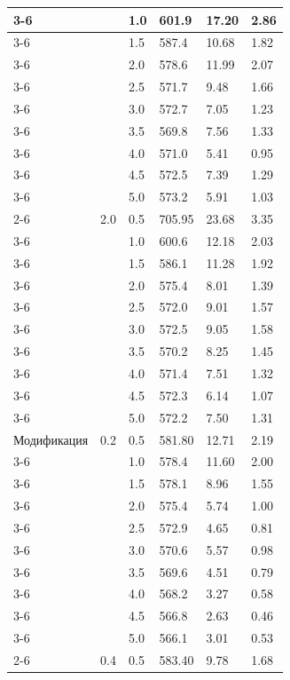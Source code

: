 \begin{longtable}{|p{}|p{}|p{}|p{}|p{}|p{}|}
	\cline{3-6}
	& & 1.0 & 601.9 & 17.20 & 2.86 \\
	\cline{3-6}
	& & 1.5 & 587.4 & 10.68 & 1.82 \\
	\cline{3-6}
	& & 2.0 & 578.6 & 11.99 & 2.07 \\
	\cline{3-6}
	& & 2.5 & 571.7 & 9.48 & 1.66 \\
	\cline{3-6}
	& & 3.0 & 572.7 & 7.05 & 1.23 \\
	\cline{3-6}
	& & 3.5 & 569.8 & 7.56 & 1.33 \\
	\cline{3-6}
	& & 4.0 & 571.0 & 5.41 & 0.95 \\
	\cline{3-6}
	& & 4.5 & 572.5 & 7.39 & 1.29 \\
	\cline{3-6}
	& & 5.0 & 573.2 & 5.91 & 1.03 \\
	\cline{2-6}
	& 2.0 & 0.5 & 705.95 & 23.68 & 3.35 \\
	\cline{3-6}
	& & 1.0 & 600.6 & 12.18 & 2.03 \\
	\cline{3-6}
	& & 1.5 & 586.1 & 11.28 & 1.92 \\
	\cline{3-6}
	& & 2.0 & 575.4 & 8.01 & 1.39 \\
	\cline{3-6}
	& & 2.5 & 572.0 & 9.01 & 1.57 \\
	\cline{3-6}
	& & 3.0 & 572.5 & 9.05 & 1.58 \\
	\cline{3-6}
	& & 3.5 & 570.2 & 8.25 & 1.45 \\
	\cline{3-6}
	& & 4.0 & 571.4 & 7.51 & 1.32 \\
	\cline{3-6}
	& & 4.5 & 572.3 & 6.14 & 1.07 \\
	\cline{3-6}
	& & 5.0 & 572.2 & 7.50 & 1.31 \\
	\hline
	Модификация & 0.2 & 0.5 & 581.80 & 12.71 & 2.19 \\
	\cline{3-6}
	& & 1.0 & 578.4 & 11.60 & 2.00 \\
	\cline{3-6}
	& & 1.5 & 578.1 & 8.96 & 1.55 \\
	\cline{3-6}
	& & 2.0 & 575.4 & 5.74 & 1.00 \\
	\cline{3-6}
	& & 2.5 & 572.9 & 4.65 & 0.81 \\
	\cline{3-6}
	& & 3.0 & 570.6 & 5.57 & 0.98 \\
	\cline{3-6}
	& & 3.5 & 569.6 & 4.51 & 0.79 \\
	\cline{3-6}
	& & 4.0 & 568.2 & 3.27 & 0.58 \\
	\cline{3-6}
	& & 4.5 & 566.8 & 2.63 & 0.46 \\
	\cline{3-6}
	& & 5.0 & 566.1 & 3.01 & 0.53 \\
	\cline{2-6}
	& 0.4 & 0.5 & 583.40 & 9.78 & 1.68 \\

\end{longtable}
